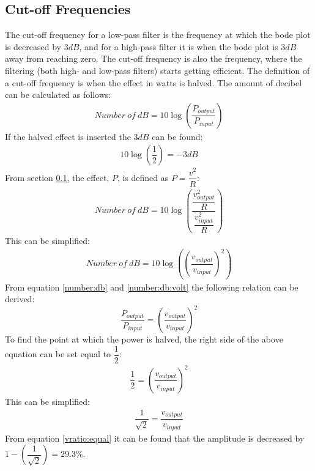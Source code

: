 \subsection{Cut-off Frequencies}
The cut-off frequency for a low-pass filter is the frequency at which the bode plot is decreased by $3dB$, and for a high-pass filter it is when the bode plot is $3dB$ away from reaching zero. The cut-off frequency is also the frequency, where the filtering (both high- and low-pass filters) starts getting efficient. The definition of a cut-off frequency is when the effect in watts is halved. The amount of decibel can be calculated as follows: \cite[p. 596-597]{bcircuit}
\begin{align} \label{number:db}
Number \ of \ dB = 10 \log \left(\dfrac{P_{output}}{P_{input}} \right)
\end{align}
If the halved effect is inserted the $3dB$ can be found:
\begin{align*} 
10 \log \left(\dfrac{1}{2} \right) = -3 dB
\end{align*}
From section \ref{}, the effect, $P$, is defined as $P=\dfrac{v^2}{R}$:
\begin{align*}
Number \ of \ dB = 10 \log \left(\dfrac{\dfrac{v_{output}^2}{R}}{\dfrac{v_{input}^2}{R}} \right)
\end{align*}
This can be simplified:
\begin{align} \label{number:db:volt}
Number \ of \ dB = 10 \log \left(\left(\dfrac{v_{output}}{v_{input}} \right)^2\right)
\end{align}
From equation \eqref{number:db} and \eqref{number:db:volt} the following relation can be derived: $$\dfrac{P_{output}}{P_{input}}= \left(\dfrac{v_{output}}{v_{input}} \right)^2$$ To find the point at which the power is halved, the right side of the above equation can be set equal to $\dfrac{1}{2}$:
\begin{align*}
\dfrac{1}{2}= \left(\dfrac{v_{output}}{v_{input}} \right)^2
\end{align*}
This can be simplified:
\begin{align} \label{vratio:equal}
\dfrac{1}{\sqrt{2}}= \dfrac{v_{output}}{v_{input}}
\end{align}
From equation \eqref{vratio:equal} it can be found that the amplitude is decreased by $1-\left(\dfrac{1}{\sqrt{2}} \right) = 29.3\%$.

